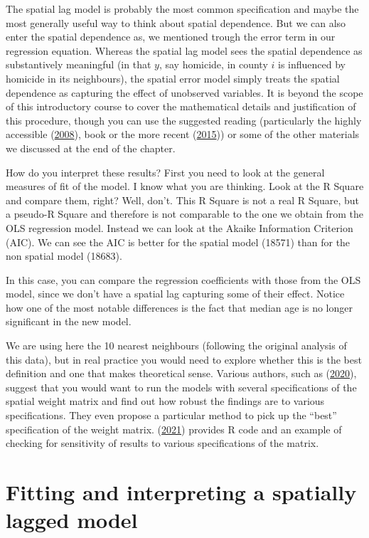 \documentclass[
  krantz2]{krantz}
\begin{document}
The spatial lag model is probably the most common specification and maybe the most generally useful way to think about spatial dependence. But we can also enter the spatial dependence as, we mentioned trough the error term in our regression equation. Whereas the spatial lag model sees the spatial dependence as substantively meaningful (in that \(y\), say homicide, in county \(i\) is influenced by homicide in its neighbours), the spatial error model simply treats the spatial dependence as capturing the effect of unobserved variables. It is beyond the scope of this introductory course to cover the mathematical details and justification of this procedure, though you can use the suggested reading (particularly the highly accessible (\protect\hyperlink{ref-Ward_2008}{2008}), book or the more recent (\protect\hyperlink{ref-Darmofal_2015}{2015})) or some of the other materials we discussed at the end of the chapter.

How do you interpret these results? First you need to look at the general measures of fit of the model. I know what you are thinking. Look at the R Square and compare them, right? Well, don't. This R Square is not a real R Square, but a pseudo-R Square and therefore is not comparable to the one we obtain from the OLS regression model. Instead we can look at the Akaike Information Criterion (AIC). We can see the AIC is better for the spatial model (18571) than for the non spatial model (18683).

In this case, you can compare the regression coefficients with those from the OLS model, since we don't have a spatial lag capturing some of their effect. Notice how one of the most notable differences is the fact that median age is no longer significant in the new model.

We are using here the 10 nearest neighbours (following the original analysis of this data), but in real practice you would need to explore whether this is the best definition and one that makes theoretical sense. Various authors, such as (\protect\hyperlink{ref-Chi_2020}{2020}), suggest that you would want to run the models with several specifications of the spatial weight matrix and find out how robust the findings are to various specifications. They even propose a particular method to pick up the ``best'' specification of the weight matrix. (\protect\hyperlink{ref-Kopczewska_2021}{2021}) provides R code and an example of checking for sensitivity of results to various specifications of the matrix.

\hypertarget{fitting-and-interpreting-a-spatially-lagged-model}{%
\section{Fitting and interpreting a spatially lagged model}\label{fitting-and-interpreting-a-spatially-lagged-model}}
\end{document}
